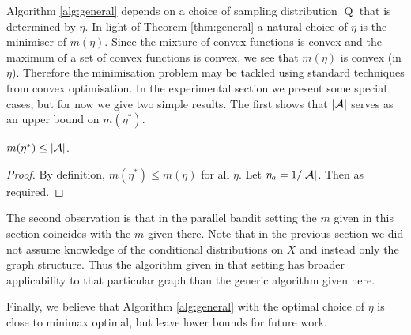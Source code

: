 Algorithm \ref{alg:general} depends on a choice of sampling distribution $\operatorname{Q}$ that is determined by $\eta$. In light of Theorem \ref{thm:general}
a natural choice of $\eta$ is the minimiser of $m(\eta)$.
Since the mixture of convex functions is convex and the maximum of a set of convex functions is convex, we see that $m(\eta)$ is convex (in $\eta$).
Therefore the minimisation problem may be tackled using standard techniques from convex optimisation. In the experimental section we present some special cases,
but for now we give two simple results. The first shows that $|\mathcal A|$ serves as an upper bound on $m(\eta^*)$.

\begin{lemma}
$m(\eta^*) \leq |\mathcal A|$.
\end{lemma}

\begin{proof}
By definition, $m(\eta^*) \leq m(\eta)$ for all $\eta$. Let $\eta_a = 1/|\mathcal A|$. Then
as required.
\end{proof}

The second observation is that in the parallel bandit setting the $m$ given in this section coincides with the $m$ given there.
Note that in the previous section we did not assume knowledge of the conditional distributions on $X$ and instead only the graph structure.
Thus the algorithm given in that setting has broader applicability to that particular graph than the generic algorithm given here.

Finally, we believe that Algorithm \ref{alg:general} with the optimal choice of $\eta$ is close to minimax optimal, but leave lower bounds
for future work.




